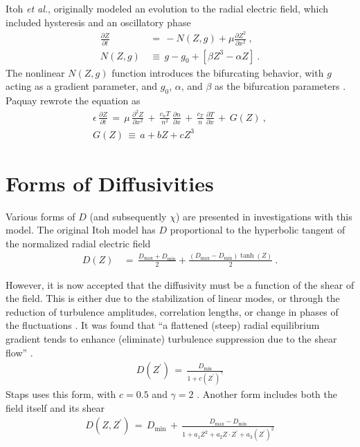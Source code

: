Itoh \emph{et al.}, originally modeled an evolution to the radial electric field, which included hysteresis and an oscillatory phase \cite{itoh_edge_1991}
\begin{align} %
	\frac{\partial Z}{\partial t} \,&=\, -N(Z,g) + \mu \frac{\partial Z^2}{\partial x^2}~,\label{eq:original_z} \\
	N(Z,g) \,&\equiv\, g - g_0 + \left[\beta Z^3 - \alpha Z\right]~.
\end{align}
The nonlinear $N(Z,g)$ function introduces the bifurcating behavior, with $g$ acting as a gradient parameter, and $g_0$, $\alpha$, and $\beta$ as the bifurcation parameters \cite{itoh_model_1988}.
Paquay rewrote the equation as
\begin{align} %
	\epsilon \, \frac{\partial Z}{\partial t} \,=\, \mu \, \frac{\partial^2 Z}{\partial x^2} \,+\,
		\frac{c_n T}{n^2} \, \frac{\partial n}{\partial x} \,+\,
		\frac{c_T}{n} \, \frac{\partial T}{\partial x} \,+\, G(Z)~,\label{eq:paquay_Z} \\
	G(Z) \,\equiv\, a + bZ + cZ^3 \label{eq:G_polynomial}
\end{align}

\section{Forms of Diffusivities}\label{sec:diffusivities}
Various forms of $D$ (and subsequently $\chi$) are presented in investigations with this model.
The original Itoh model has $D$ proportional to the hyperbolic tangent of the normalized radial electric field \cite{itoh_edge_1991, zohm_dynamic_1994}
\begin{align} %
	D(Z) \,&=\, \frac{D_\text{max} + D_\text{min}}{2} +
		\frac{(D_\text{max} - D_\text{min})\tanh(Z)}{2}~. \label{eq:Itoh_diffusivity}
\end{align}

However, it is now accepted that the diffusivity must be a function of the shear of the field.
This is either due to the stabilization of linear modes, or through the reduction of turbulence amplitudes, correlation lengths, or change in phases of the fluctuations \cite{connor_review_2000}.
It was found that ``a flattened (steep) radial equilibrium gradient tends to enhance (eliminate) turbulence suppression due to the shear flow'' \cite{zhang_edge_1992}.
\begin{align} %
	D(Z^{\prime}) \,=\, \frac{D_\text{min}}{1 + c(Z^{\prime})^{\gamma}} \label{eq:shear_diffusivity}
\end{align}
Staps uses this form, with $c = 0.5$ and $\gamma = 2$ \cite{staps_backstepping_2017}.
Another form includes both the field itself and its shear \cite{paquay_studying_2012}
\begin{align} %
	D(Z, Z^{\prime}) \,=\, D_\text{min} \,+\, \frac{D_\text{max} - D_\text{min}}{1 + a_1 Z^2 + a_2 Z \cdot Z^{\prime} + a_3 (Z^{\prime})^2} \label{eq:flow-shear}
\end{align}

